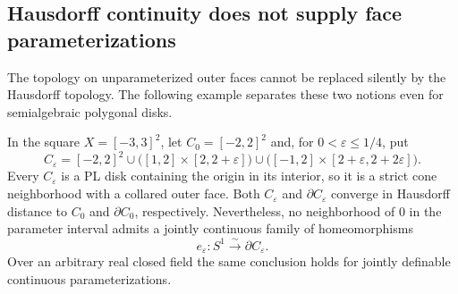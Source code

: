 \subsection{Hausdorff continuity does not supply face parameterizations}

The topology on unparameterized outer faces cannot be replaced silently
by the Hausdorff topology.  The following example separates these two
notions even for semialgebraic polygonal disks.

\begin{example}\label{ex:hausdorff-hairpin}
In the square $X=[-3,3]^2$, let $C_0=[-2,2]^2$ and, for
$0<\varepsilon\leq 1/4$, put
\[
 C_\varepsilon=[-2,2]^2
 \cup\bigl([1,2]\times[2,2+\varepsilon]\bigr)
 \cup\bigl([-1,2]\times[2+\varepsilon,2+2\varepsilon]\bigr).
\]
Every $C_\varepsilon$ is a PL disk containing the origin in its interior,
so it is a strict cone neighborhood with a collared outer face.
Both $C_\varepsilon$ and $\partial C_\varepsilon$ converge in Hausdorff
distance to $C_0$ and $\partial C_0$, respectively.  Nevertheless, no
neighborhood of $0$ in the parameter interval admits a jointly
continuous family of homeomorphisms
\[
 e_\varepsilon:S^1\xrightarrow{\sim}\partial C_\varepsilon.
\]
Over an arbitrary real closed field the same conclusion holds for
jointly definable continuous parameterizations.
\end{example}

